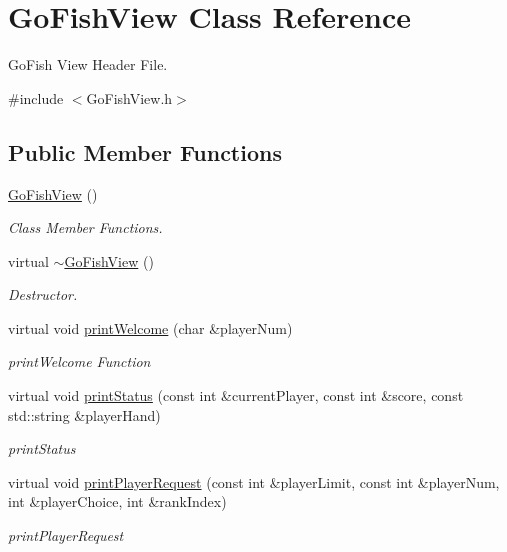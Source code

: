 \hypertarget{classGoFishView}{\section{Go\-Fish\-View Class Reference}
\label{classGoFishView}
}


Go\-Fish View Header File.  




{\ttfamily \#include $<$Go\-Fish\-View.\-h$>$}

\subsection*{Public Member Functions}
\begin{DoxyCompactItemize}
\item 
\hyperlink{classGoFishView_aa1a2d9d11967baa56786e5435e8147fd}{Go\-Fish\-View} ()
\begin{DoxyCompactList}\small\item\em Class Member Functions. \end{DoxyCompactList}\item 
virtual \hyperlink{classGoFishView_a91caabc4f0396613b6e95b889c8bd84b}{$\sim$\-Go\-Fish\-View} ()
\begin{DoxyCompactList}\small\item\em Destructor. \end{DoxyCompactList}\item 
virtual void \hyperlink{classGoFishView_a26905503630d55015a7440f1bf6c9676}{print\-Welcome} (char \&player\-Num)
\begin{DoxyCompactList}\small\item\em print\-Welcome Function \end{DoxyCompactList}\item 
virtual void \hyperlink{classGoFishView_a57fca59e638472b79dbfa16f91536064}{print\-Status} (const int \&current\-Player, const int \&score, const std\-::string \&player\-Hand)
\begin{DoxyCompactList}\small\item\em print\-Status \end{DoxyCompactList}\item 
virtual void \hyperlink{classGoFishView_a41cebea5e61f01b07df24ca884964bd7}{print\-Player\-Request} (const int \&player\-Limit, const int \&player\-Num, int \&player\-Choice, int \&rank\-Index)
\begin{DoxyCompactList}\small\item\em print\-Player\-Request \end{DoxyCompactList}\item 

\end{DoxyCompactItemize}
